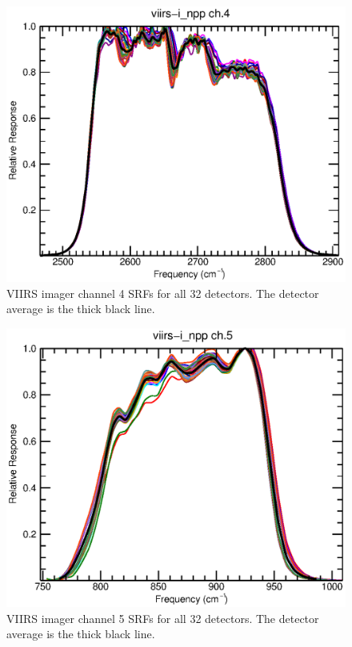 \begin{figure}[H]
  \centering
  \includegraphics[bb= 0 15 400 330,clip,scale=0.8]{graphics/srfs/viirs-i_npp-04.eps}
  \caption{VIIRS imager channel 4 SRFs for all 32 detectors. The detector average is the thick black line.}
  \label{fig:viirs-i_npp-04}
\end{figure}
\begin{figure}[H]
  \centering
  \includegraphics[bb= 0 15 400 330,clip,scale=0.8]{graphics/srfs/viirs-i_npp-05.eps}
  \caption{VIIRS imager channel 5 SRFs for all 32 detectors. The detector average is the thick black line.}
  \label{fig:viirs-i_npp-05}
\end{figure}


\clearpage




%



